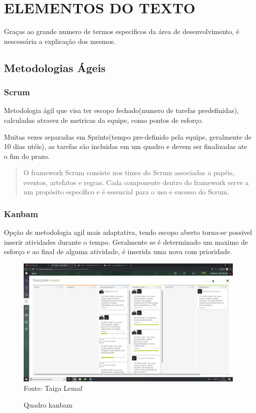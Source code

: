 \chapter{ELEMENTOS DO TEXTO}
\label{cap:elementos}

Graças ao grande numero de termos especificos da área de desenvolvimento, é nescessária a explicação dos mesmos.

\section{Metodologias Ágeis}

\subsection{Scrum}

Metodologia ágil que visa ter escopo fechado(numero de tarefas predefinidas), calculadas atravez de metricas da equipe, como pontos de esforço.

Muitas vezes separadas em Sprints(tempo pre-definido pela equipe, geralmente de 10 dias utéis), as tarefas são incluidas em um quadro e devem ser finalizadas ate o fim do prazo.

\begin{quote}
  O framework Scrum consiste nos times do Scrum associadas a papéis, eventos, artefatos e
  regras. Cada componente dentro do framework serve a um propósito específico e é essencial
  para o uso e sucesso do Scrum.
\end{quote}

\subsection{Kanbam}
  Opção de metodologia agil mais adaptativa, tendo escopo aberto torna-se possivel inserir atividades durante o tempo.
  Geralmente se é determinado um maximo de esforço e ao final de alguma atividade, é inserida uma nova com prioridade.
\begin{figure}[!htb]
\centering
\caption{Quadro kanbam} %
\includegraphics[scale=0.2]{quadroKanbam}\\  %
{\small Fonte: Taiga Lemaf} %
\label{fig:exemplo} %
\end{figure}

